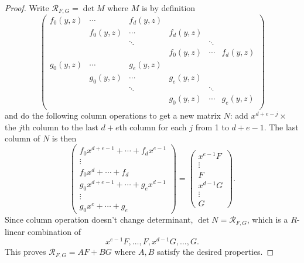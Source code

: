 \documentclass{article}
\newcommand{\re}{\mathcal{R}}
\theoremstyle{definition}
\begin{document}
\begin{proof}
Write $\re_{F,G}=\det M$ where $M$ is by definition
\[
\begin{pmatrix}
f_0(y,z) & \cdots & f_d(y,z) \\
& f_0(y,z) & \cdots & f_d(y,z) \\
& & \ddots & & \ddots \\
& & & f_0(y,z) & \cdots & f_d(y,z) \\
g_0(y,z) & \cdots & g_e(y,z) \\
& g_0(y,z) & \cdots & g_e(y,z) \\
& & \ddots & & \ddots \\
& & & g_0(y,z) & \cdots & g_e(y,z) \\
\end{pmatrix}
\]
and do the following column operations to get a new matrix $N$: add $x^{d+e-j}\times$ the $j$th column to the last $d+e$th column for each $j$ from 1 to $d+e-1$. The last column of $N$ is then
\[
\begin{pmatrix}
f_0x^{d+e-1}+\cdots+f_dx^{e-1} \\
\vdots \\
f_0x^d+\cdots+f_d \\
g_0x^{d+e-1}+\cdots+g_ex^{d-1} \\
\vdots \\
g_0x^e+\cdots+g_e
\end{pmatrix}=\begin{pmatrix}
x^{e-1}F\\
\vdots \\
F \\
x^{d-1} G \\
\vdots \\
G
\end{pmatrix}.
\]
Since column operation doesn't change determinant, $\det N=\re_{F,G}$, which is a $R$-linear combination of
\[
x^{e-1}F,\ldots,F,x^{d-1}G,\ldots,G.
\]
This proves $\re_{F,G}=AF+BG$ where $A,B$ satisfy the desired properties.


\end{proof}
\end{document}
